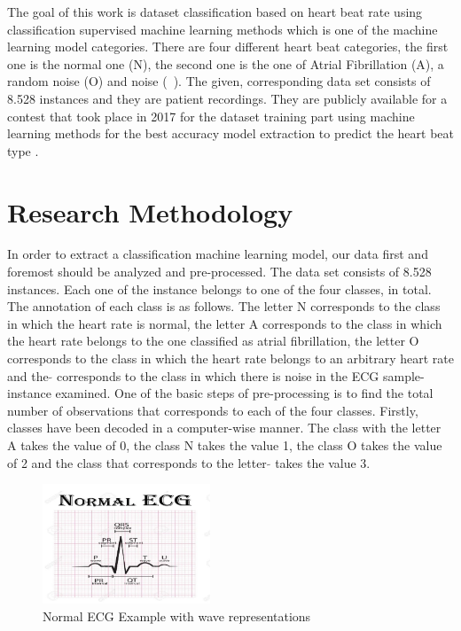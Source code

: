 \documentclass[review]{elsarticle}
\begin{document}
The goal of this work is dataset classification based on heart beat rate using classification supervised machine learning methods which is one of the machine learning model categories. There are four different heart beat categories, the first one is the normal one (N), the second one is the one of Atrial Fibrillation (A), a random noise (O) and noise (~). The given, corresponding data set consists of 8.528 instances and they are patient recordings. They are publicly available for a contest that took place in 2017 for the dataset training part using machine learning methods for the best accuracy model extraction to predict the heart beat type \cite{linkerAccurateAutomatedDetection2016}. 


%

\section{Research Methodology}
In order to extract a classification machine learning model, our data first and foremost should be analyzed and pre-processed. The data set consists of 8.528 instances. Each one of the instance belongs to one of the four classes, in total. The annotation of each class is as follows. The letter N corresponds to the class in which the heart rate is normal, the letter A corresponds to the class in which the heart rate belongs to the one classified as atrial fibrillation, the letter O corresponds to the class in which the heart rate belongs to an arbitrary heart rate and the $\tilde{}$ corresponds to the class in which there is noise in the ECG sample-instance examined.
One of the basic steps of pre-processing is to find the total number of observations that corresponds to each of the four classes. Firstly, classes have been decoded in a computer-wise manner. The class with the letter A takes the value of 0, the class N takes the value 1, the class O takes the value of 2 and the class that corresponds to the letter $\tilde{}$ takes the value 3. 


\begin{figure}[h!]
	\includegraphics[width=50mm,scale=0.5]{./Figures/NormalECG.png}
	\centering
	\caption{Normal ECG Example with wave representations}
	\label{fig:NormalECG}
\end{figure}
\end{document}
